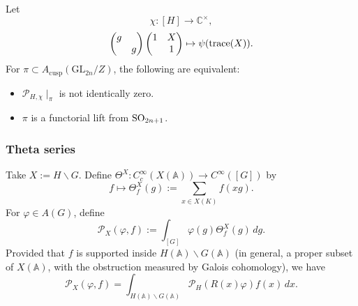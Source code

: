 \documentclass[reqno]{amsart} 
\begin{document}
\begin{example}
\begin{enumerate}[(a)]
\begin{equation*}
    \end{equation*}
    Let
    \begin{equation*}
      \chi :[H] \rightarrow \mathbb{C}^\times,
    \end{equation*}
    \begin{equation*}
      \begin{pmatrix}
        g        &  \\
                 & g \\
      \end{pmatrix}
      \begin{pmatrix}
        1        & X \\
                 & 1 \\
      \end{pmatrix}
      \mapsto \psi(\operatorname{trace}(X)).
    \end{equation*}
    For $\pi \subset A_{\mathrm{cusp}}(\mathrm{GL}_{2 n} / Z)$, the following are equivalent:
    \begin{itemize}
    \item $\mathcal{P}_{H, \chi} \mid_\pi$ is not identically zero.
    \item $\pi$ is a functorial lift from $\operatorname{SO}_{2 n + 1}$.
    \end{itemize}
  \end{enumerate}
\end{example}

\subsubsection{Theta series}

Take $X := H \backslash G$.  Define $\Theta^X : C_c^\infty(X(\mathbb{A})) \rightarrow C^\infty([G])$ by
\begin{equation*}
  f \mapsto \Theta_f^X(g) := \sum_{x \in X(K)} f(x g).
\end{equation*}
For $\varphi \in A(G)$, define
\begin{equation*}
  \mathcal{P}_X(\varphi, f) := \int_{[G]}
  \varphi(g) \Theta_f^X(g) \, d g.
\end{equation*}
Provided that $f$ is supported inside $H(\mathbb{A}) \backslash G(\mathbb{A})$ (in general, a proper subset of $X(\mathbb{A})$, with the obstruction measured by Galois cohomology), we have
\begin{equation*}
  \mathcal{P}_X(\varphi, f) = \int_{H(\mathbb{A}) \backslash G(\mathbb{A})}
  \mathcal{P}_H(R(x) \varphi) f(x) \, d x.
\end{equation*}





{} 
\end{document}
